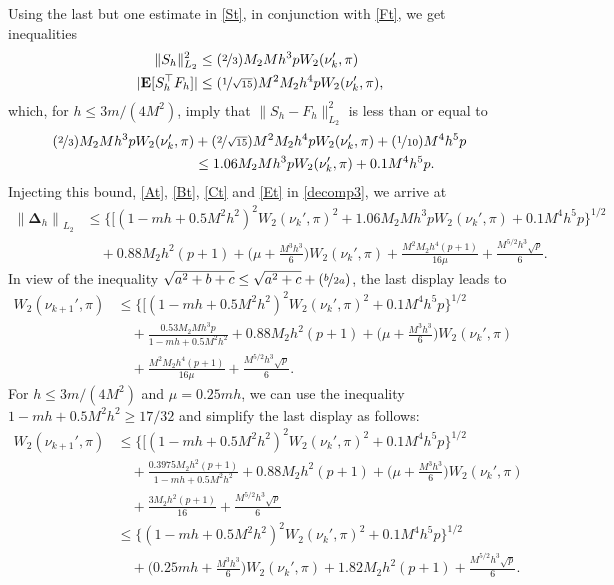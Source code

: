 \documentclass[aoap,preprint,reqno,a4paper]{imsart} %
\newcommand{\bDelta}{\boldsymbol{\Delta}}
\newcommand{\bfE}{\mathbf E}
\begin{document}
Using the last but one estimate in \eqref{St}, in conjunction with \eqref{Ft}, we get
inequalities
\begin{align}
\|S_h\|_{L_2}^2 &\le (\nicefrac23)M_2Mh^3p W_2(\nu_k',\pi)\\
|\bfE[S_h^\top F_h]| &\le (\nicefrac1{\sqrt{15}})M^2 M_2 h^4pW_2(\nu_k',\pi),
\end{align}
which, for $h\le 3m/(4M^2)$, imply that $\|S_h-F_h\|_{L_2}^2$ is less than or equal to
\begin{align}
(\nicefrac23)M_2Mh^3p W_2(\nu_k',\pi) &+ (\nicefrac2{\sqrt{15}})M^2 M_2 h^4pW_2(\nu_k',\pi)+(\nicefrac1{10})M^4h^5p\\
		&\le 1.06 M_2Mh^3p W_2(\nu_k',\pi) + 0.1 M^4 h^5p.
\end{align}
Injecting this bound, \eqref{At}, \eqref{Bt}, \eqref{Ct} and \eqref{Et} in \eqref{decomp3}, we arrive at
\begin{align}
{\|\bDelta_h\|}_{L_2}
		&\le \big\{\big[(1-mh+0.5M^2h^2)^2W_2(\nu_k',\pi)^2 + 1.06M_2Mh^3p W_2(\nu_k',\pi)  + 0.1 M^4 h^5p\big\}^{1/2} \\
		&\quad+ 0.88M_2h^2(p+1) + \Big(\mu + \frac{M^3h^3}{6}\Big)W_2(\nu_k',\pi) +\frac{M^2M_2h^4(p+1)}{16\mu}
				+ \frac{M^{5/2}h^3\sqrt{p}}{6}.\label{decomp3'}
\end{align}
In view of the inequality $\sqrt{a^2+b+c}\le \sqrt{a^2+c}+(\nicefrac{b}{2a})$, the last display leads to
\begin{align}
W_2(\nu_{k+1}',\pi)
		&\le \big\{\big[(1-mh+0.5M^2h^2)^2W_2(\nu_k',\pi)^2 +  0.1 M^4 h^5p\big\}^{1/2} \\
		&\quad+ \frac{0.53M_2Mh^3p}{1-mh+0.5M^2h^2} + 0.88M_2h^2(p+1) + \Big(\mu + \frac{M^3h^3}{6}\Big)W_2(\nu_k',\pi)\\
		&\quad+ \frac{M^2M_2h^4(p+1)}{16\mu}
				+ \frac{M^{5/2}h^3\sqrt{p}}{6}.\label{decomp4}
\end{align}
For $h\le 3m/(4M^2)$ and  $\mu = 0.25mh$, we can use the inequality $1-mh+0.5M^2h^2 \ge 17/32$ and
simplify the last display as follows:
\begin{align}
W_2(\nu_{k+1}',\pi)
		&\le \big\{\big[(1-mh+0.5M^2h^2)^2W_2(\nu_k',\pi)^2 +  0.1 M^4 h^5p\big\}^{1/2} \\
		&\quad+ \frac{0.3975 M_2h^2(p+1)}{1-mh+0.5M^2h^2} + 0.88M_2h^2(p+1) + \Big(\mu + \frac{M^3h^3}{6}\Big)W_2(\nu_k',\pi)\\
		&\quad+ \frac{3M_2h^2(p+1)}{16}
				+ \frac{M^{5/2}h^3\sqrt{p}}{6}\\
		&\le \big\{(1-mh+0.5M^2h^2)^2W_2(\nu_k',\pi)^2 +  0.1 M^4 h^5p\big\}^{1/2} \\
		&\quad + \Big(0.25mh + \frac{M^3h^3}{6}\Big)W_2(\nu_k',\pi) + 1.82M_2h^2(p+1) + \frac{M^{5/2}h^3\sqrt{p}}{6}.
\end{align}
\end{document}
